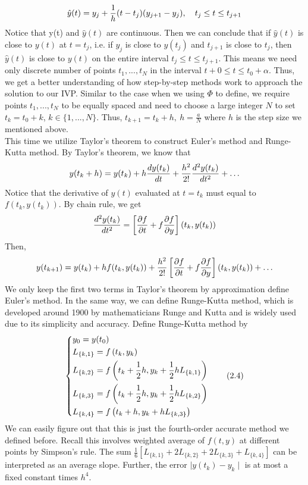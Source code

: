 \documentclass[
11pt, %
a4paper, %
oneside, %
headinclude,footinclude, %
BCOR5mm, %
]{scrartcl}
\begin{document}
\begin{equation}
    \hat{y}(t)=y_j+\frac{1}{h}(t-t_j)(y_{j+1}-y_j), \quad t_j\leq t\leq t_{j+1} \notag
\end{equation}
Notice that y(t) and $\hat{y}(t)$ are continuous. Then we can conclude that if $\hat{y}(t)$ is close to $y(t)$ at $t=t_j$, i.e. if $y_j$ is close to $y(t_j)$ and $t_{j+1}$ is close to $t_j$, then $\hat{y}(t)$ is close to $y(t)$ on the entire interval $t_j\leq t\leq t_{j+1}$. This means we need only discrete number of points $t_1,...,t_N$ in the interval $t+0\leq t\leq t_0+\alpha$. Thus, we get a better understanding of how step-by-step methods work to approach the solution to our IVP. Similar to the case when we using $\Phi$ to define, we require points $t_1,...,t_N$ to be equally spaced and need to choose a large integer $N$ to set $t_k=t_0+k$, $k \in \{1,...,N\}$. Thus, $t_{k+1}=t_k+h, \ h=\frac{a}{N}$ where $h$ is the step size we mentioned above. 
\vspace{0.6em}\\This time we utilize Taylor's theorem to construct Euler's method and Runge-Kutta method. By Taylor's theorem, we know that 
\begin{equation}
    y(t_k+h)=y(t_k)+h\frac{dy(t_k)}{dt}+\frac{h^2}{2!}\frac{d^2y(t_k)}{dt^2}+\dots \notag
\end{equation} 
Notice that the derivative of $y(t)$ evaluated at $t=t_k$ must equal to $f(t_k,y(t_k))$. By chain rule, we get 
\begin{equation}
    \frac{d^2y(t_k)}{dt^2}=\left[\frac{\partial f}{\partial t}+f\frac{\partial f}{\partial y}\right](t_k,y(t_k)) \notag
\end{equation}
Then,
\begin{equation}
    y(t_{k+1})=y(t_k)+hf(t_k,y(t_k))+\frac{h^2}{2!}\left[\frac{\partial f}{\partial t}+f\frac{\partial f}{\partial y}\right](t_k,y(t_k))+\dots \notag
\end{equation}
We only keep the first two terms in Taylor's theorem by approximation define Euler's method. In the same way, we can define Runge-Kutta method, which is developed around 1900 by mathematicians Runge and Kutta and is widely used due to its simplicity and accuracy. Define Runge-Kutta method by
\begin{equation}
\centering
\left\{\begin{split}
&y_0=y(t_0)\\
&L_{\{k,1\}}=f\left(t_k,y_k\right)\\
&L_{\{k,2\}}=f\left(t_k+\frac{1}{2}h,y_k+\frac{1}{2}hL_{\{k,1\}}\right)\\
&L_{\{k,3\}}=f\left(t_k+\frac{1}{2}h,y_k+\frac{1}{2}hL_{\{k,2\}}\right)\\
&L_{\{k,4\}}=f\left(t_k+h,y_k+hL_{\{k,3\}}\right)
\end{split}\right.\tag{2.4}
\end{equation}
We can easily figure out that this is just the fourth-order accurate method we defined before. Recall this involves weighted average of $f(t,y)$ at different points by Simpson's rule. The sum $\frac{1}{6}\left[L_{\{k,1\}}+2L_{\{k,2\}}+2L_{\{k,3\}}+L_{\{k,4\}}\right]$ can be interpreted as an average slope. Further, the error $\mid y(t_k)-y_k\mid$ is at most a fixed constant times $h^4$. 
\end{document}
